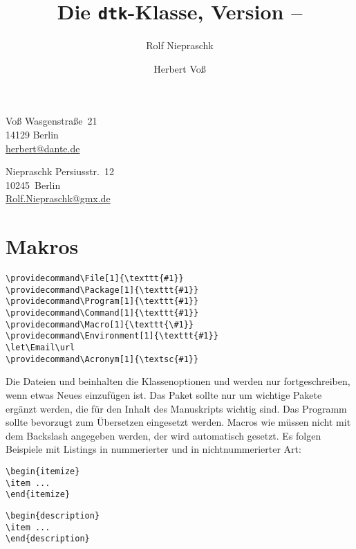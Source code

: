 \documentclass[10,ngerman]{dtk}
\begin{document}
\title{Die \texttt{dtk}-Klasse, \small Version \DTKversion -- \DTKdate}
\author{Rolf Niepraschk\and Herbert Voß}
\address{Herbert}{Voß}
    {Wasgenstraße~21\\
     14129 Berlin\\
     \protect\url{herbert@dante.de}}
\address{Rolf}{Niepraschk}%
    {Persiusstr.~12\\
     10245~Berlin\\
     \protect\url{Rolf.Niepraschk@gmx.de}}
\maketitle

\section{Makros}

\begin{verbatim}
\providecommand\File[1]{\texttt{#1}}
\providecommand\Package[1]{\texttt{#1}}
\providecommand\Program[1]{\texttt{#1}}
\providecommand\Command[1]{\texttt{#1}}
\providecommand\Macro[1]{\texttt{\#1}}
\providecommand\Environment[1]{\texttt{#1}}
\let\Email\url
\providecommand\Acronym[1]{\textsc{#1}}
\end{verbatim}

Die Dateien  und  beinhalten die Klassenoptionen und
werden nur fortgeschreiben, wenn etwas Neues einzufügen ist. Das Paket
 sollte nur um wichtige Pakete ergänzt werden, die für den Inhalt
des Manuskripts wichtig sind. Das Programm  sollte bevorzugt
zum Übersetzen eingesetzt werden. Macros wie  müssen nicht mit
dem Backslash angegeben werden, der wird automatisch gesetzt. Es folgen
Beispiele mit Listings in nummerierter und in nichtnummerierter Art:

\begin{lstlisting}[style=DTKlstNumber]
\begin{itemize}
\item ...
\end{itemize}
\end{lstlisting}

\begin{lstlisting}[style=DTKlstNoNumber]
\begin{description}
\item ...
\end{description}
\end{lstlisting}
\end{document}
